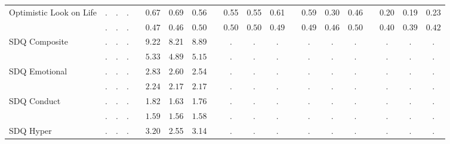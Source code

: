 \begin{center}
{\begin{longtable}{L{5cm} c c c p{.5cm} c c c p{.5cm} c c c p{.5cm} c c c p{.5cm} c c c}
Optimistic Look on Life & . &         . &         . & &      0.67 &      0.69 &      0.56 & &      0.55 &      0.55 &      0.61 & &      0.59 &      0.30 &      0.46 & &      0.20 &      0.19 &      0.23 \\*
& $\mathit{        .}$ & $\mathit{        .}$ & $\mathit{        .}$ & & $\mathit{     0.47}$ & $\mathit{     0.46}$ & $\mathit{     0.50}$ & & $\mathit{     0.50}$ & $\mathit{     0.50}$ & $\mathit{     0.49}$ & & $\mathit{     0.49}$ & $\mathit{     0.46}$ & $\mathit{     0.50}$ & & $\mathit{     0.40}$ & $\mathit{     0.39}$ & $\mathit{     0.42}$ \\[.7em]
SDQ Composite & . &         . &         . & &      9.22 &      8.21 &      8.89 & &         . &         . &         . & &         . &         . &         . & &         . &         . &         . \\*
& $\mathit{        .}$ & $\mathit{        .}$ & $\mathit{        .}$ & & $\mathit{     5.33}$ & $\mathit{     4.89}$ & $\mathit{     5.15}$ & & $\mathit{        .}$ & $\mathit{        .}$ & $\mathit{        .}$ & & $\mathit{        .}$ & $\mathit{        .}$ & $\mathit{        .}$ & & $\mathit{        .}$ & $\mathit{        .}$ & $\mathit{        .}$ \\[.7em]
SDQ Emotional & . &         . &         . & &      2.83 &      2.60 &      2.54 & &         . &         . &         . & &         . &         . &         . & &         . &         . &         . \\*
& $\mathit{        .}$ & $\mathit{        .}$ & $\mathit{        .}$ & & $\mathit{     2.24}$ & $\mathit{     2.17}$ & $\mathit{     2.17}$ & & $\mathit{        .}$ & $\mathit{        .}$ & $\mathit{        .}$ & & $\mathit{        .}$ & $\mathit{        .}$ & $\mathit{        .}$ & & $\mathit{        .}$ & $\mathit{        .}$ & $\mathit{        .}$ \\[.7em]
SDQ Conduct & . &         . &         . & &      1.82 &      1.63 &      1.76 & &         . &         . &         . & &         . &         . &         . & &         . &         . &         . \\*
& $\mathit{        .}$ & $\mathit{        .}$ & $\mathit{        .}$ & & $\mathit{     1.59}$ & $\mathit{     1.56}$ & $\mathit{     1.58}$ & & $\mathit{        .}$ & $\mathit{        .}$ & $\mathit{        .}$ & & $\mathit{        .}$ & $\mathit{        .}$ & $\mathit{        .}$ & & $\mathit{        .}$ & $\mathit{        .}$ & $\mathit{        .}$ \\[.7em]
SDQ Hyper & . &         . &         . & &      3.20 &      2.55 &      3.14 & &         . &         . &         . & &         . &         . &         . & &         . &         . &         . \\*

\end{longtable}}
\end{center}
